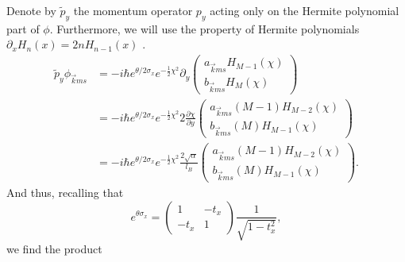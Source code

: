Denote by \(\tilde{p}_{y}\) the momentum operator \(p_{y}\) acting only on the Hermite polynomial part of \(\phi \).
Furthermore, we will use the property of Hermite polynomials \(\partial _{x} H_{n} (x) = 2 n H_{n-1} (x)\) \cite[Eq.~18.9.25]{NIST:DLMF}.
\begin{align}
  \tilde{p}_{y} \phi _{\vec{k} ms} &=
  -i \hbar
  e^{\theta /2 \sigma _{x}}
  e^{-\frac{1}{2} \chi ^2}
  \partial _{y}
  \begin{pmatrix}
    a_{\vec{k} m s} H_{M-1} (\chi) \\
    b_{\vec{k} ms} H_{M} (\chi)
  \end{pmatrix}\\
                                   &=
                                     -i \hbar
                                     e^{\theta /2 \sigma _{x}}
                                     e^{-\frac{1}{2} \chi ^2}
                                     2 \frac{\partial \chi }{\partial y}
                                     \begin{pmatrix}
                                       a_{\vec{k} m s} (M-1) H_{M-2} (\chi) \\
                                       b_{\vec{k} ms} (M) H_{M-1} (\chi)
                                     \end{pmatrix}\\
                                   &=
                                     -i \hbar
                                     e^{\theta /2 \sigma _{x}}
                                     e^{-\frac{1}{2} \chi ^2}
                                     \frac{2 \sqrt{\alpha}}{ l_{B} }
                                     \begin{pmatrix}
                                       a_{\vec{k} m s} (M-1) H_{M-2} (\chi) \\
                                       b_{\vec{k} ms} (M) H_{M-1} (\chi)
                                     \end{pmatrix}.
\end{align}
And thus, recalling that
\[
  e^{\theta \sigma _{x}} =
  \begin{pmatrix}
    1 & -t_{x}\\
    -t_{x} & 1
  \end{pmatrix}
  \frac{1}{\sqrt{1-t_{x}^2}},
\]
we find the product
